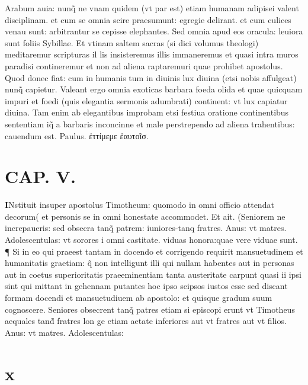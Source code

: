 \documentclass{article}
\begin{document}
\begin{pages}
Arabum auia: nunq̃ ne vnam quidem (vt par est) etiam humanam adipisei valent disciplinam. et cum se omnia scire praesumunt: egregie delirant. et cum culices venau sunt: arbitrantur se cepisse elephantes. Sed omnia apud eos oracula: leuiora sunt foliis Sybillae. Et vtinam saltem sacras (si dici volumus theologi) meditaremur scripturas il lis insisteremus illis immaneremus et quasi intra muros paradisi contineremur et non ad aliena raptaremuri quae prohibet apostolus. Quod donec fiat: cum in humanis tum in diuinis lux diuina (etsi nobis affulgeat) nunq̃ capietur. Valeant ergo omnia exoticas barbara foeda olida et quae quicquam impuri et foedi (quis elegantia sermonis adumbrati) continent: vt lux capiatur diuina. Tam enim ab elegantibus improbam etsi festiua oratione continentibus sententiam iq̃ a barbaris inconcinne et male perstrependo ad aliena trahentibus: cauendum est. Paulus. ἐττίμεμε ἐαυτοῖσ.  \pend
\endnumbering\beginnumbering\section{CAP. V.}\pstart \huge\textbf{I}\normalsize Nstituit insuper apostolus Timotheum: quomodo in omni officio attendat decorum( et personis se in omni honestate accommodet. Et ait. (Seniorem ne increpaueris: sed obsecra tanq̃ patrem: iuniores-tanq fratres. Anus: vt matres. Adolescentulas: vt sorores i omni castitate. viduas honora:quae vere viduae sunt. ¶ Si in eo qui praeest tantam in docendo et corrigendo requirit mansuetudinem et humanitatis graetiam: q̃ non intelligunt illi qui nullam habentes aut in personas aut in coetus superioritatis praeeminentiam tanta austeritate carpunt quasi ii ipsi sint qui mittant in gehennam putantes hoc ipso seipsos iustos esse sed discant formam docendi et mansuetudiuem ab apostolo: et quisque gradum suum cognoscere. Seniores obsecrent tanq̃ patres etiam si episcopi erunt vt Timotheus aequales tand̃ fratres lon ge etiam aetate inferiores aut vt fratres aut vt filios. Anus: vt matres. Adolescentulas:  \pend
\section*{x }

\end{pages}
\end{document}
